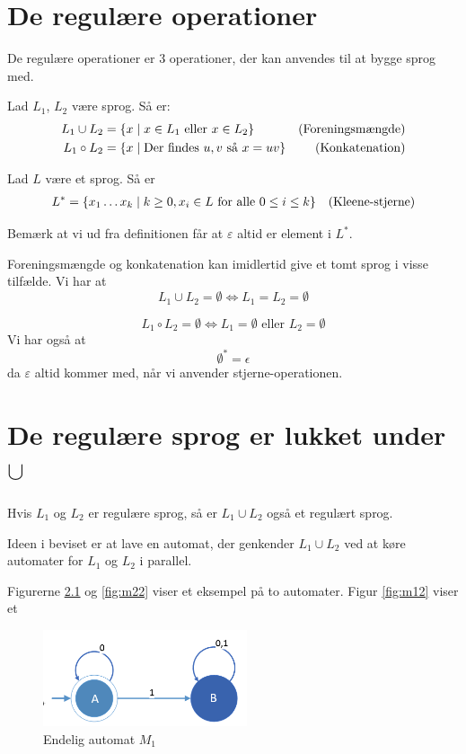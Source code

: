 \documentclass[a4paper,10pt,article]{memoir}
\begin{document}
\chapter{De regulære operationer}

De regulære operationer er 3 operationer, der kan anvendes til at
bygge sprog med.

Lad $L_1$, $L_2$ være sprog. Så er:
%
\begin{align*}
L_1 \cup L_2 & = \{ x \mid x \in L_1 \text{ eller } x \in L_2 \}  &
\text{(Foreningsmængde)} \\
L_1 \circ L_2 & = \{ x \mid \text{Der findes } u,v \text{ så } x=uv  \} &
\text{(Konkatenation)} 
\end{align*}

Lad $L$ være et sprog. Så er
%
\begin{align*}
L^* & = \{ x_1 \ldots x_k \mid k \geq 0, x_i \in L \text{ for alle } 0
  \leq i \leq k \} & \text{(Kleene-stjerne)}
\end{align*}

Bemærk at vi ud fra definitionen får at $\varepsilon$ altid er element
i $L^{\ast}$.

Foreningsmængde og konkatenation kan imidlertid give et tomt sprog i
visse tilfælde. Vi har at 
%
\[ L_1 \cup L_2 = \emptyset \iff L_1=L_2=\emptyset \]  
%

\[ L_1 \circ L_2 = \emptyset \iff  L_1 = \emptyset
\text{ eller } L_2=\emptyset \]  
%
Vi har også at
%
\[ \emptyset^{\ast} = {\epsilon}  \]  
%
da $\varepsilon$ altid kommer med, når vi anvender
stjerne-operationen.

\chapter{De regulære sprog er lukket under $\cup$}

\begin{saetning}
Hvis $L_1$ og $L_2$ er regulære sprog, så er $L_1 \cup L_2$ også et
regulært sprog.
\end{saetning}

Ideen i beviset er at lave en automat, der genkender $L_1 \cup L_2$
ved at køre automater for $L_1$ og $L_2$ i parallel.

Figurerne \ref{fig:m11} og \ref{fig:m22} viser et eksempel på to
automater. Figur \ref{fig:m12} viser et

\begin{figure}
\begin{center}
\includegraphics[width=60mm]{fig4.PNG}
\end{center}
\caption{Endelig automat $M_1$}
\label{fig:m11}
\end{figure}
\end{document}
